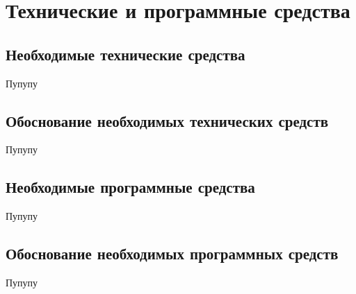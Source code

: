 \section{Технические и программные средства}

\subsection{Необходимые технические средства}

Пупупу

\subsection{Обоснование необходимых технических средств}

Пупупу

\subsection{Необходимые программные средства}

Пупупу

\subsection{Обоснование необходимых программных средств}

Пупупу